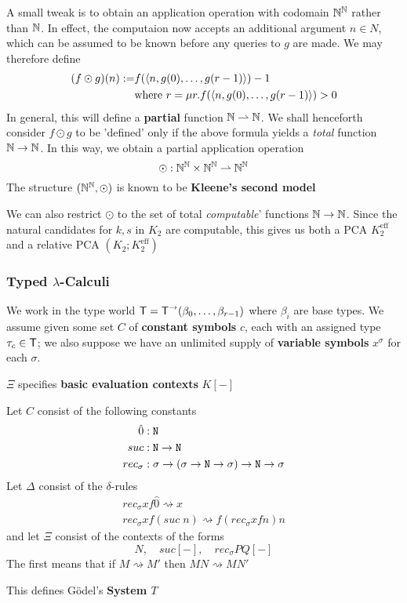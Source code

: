 \documentclass[11pt]{article}
\DeclareMathOperator{\eff}{eff}
\begin{document}
A small tweak is to obtain an application operation with codomain \(\mathbb{N}^{\mathbb{N}}\) rather than \(\mathbb{N}\).
In effect, the computaion now accepts an additional argument \(n\in N\), which can be assumed to
be known before any queries to \(g\) are made. We may therefore define
\begin{align*}
(f\odot g)(n):=&f(\langle n,g(0),\dots,g(r-1)\rangle)-1\\
&\text{where }r=\mu r.f(\langle n,g(0),\dots,g(r-1)\rangle)>0
\end{align*}
In general, this will define a \textbf{partial} function \(\mathbb{N}\rightharpoonup\mathbb{N}\). We shall henceforth
consider \(f\odot g\) to be 'defined' only if the above formula yields a \emph{total} function \(\mathbb{N}\to\mathbb{N}\). In
this way, we obtain a partial application operation
\begin{equation*}
\odot:\mathbb{N}^{\mathbb{N}}\times\mathbb{N}^{\mathbb{N}}\rightharpoonup\mathbb{N}^{\mathbb{N}}
\end{equation*}
The structure \((\mathbb{N}^{\mathbb{N}},\odot)\) is known to be \textbf{Kleene's second model}

We can also restrict \(\odot\) to the set of total \emph{computable}' functions \(\mathbb{N}\to\mathbb{N}\). Since the natural
candidates for \(k,s\) in \(K_2\) are computable, this gives us both a PCA \(K_2^{\eff}\) and a
relative PCA \((K_2;K_2^{\eff})\)
\subsubsection{Typed \texorpdfstring{\(\lambda\)}{λ}-Calculi}
\label{sec:org167de23}

We work in the type world \(\textsf{T}=\textsf{T}^{\to}(\beta_0,\dots,\beta_{r-1})\) where \(\beta_i\) are base types. We
assume given some set \(C\) of \textbf{constant symbols} \(c\), each with an assigned type \(\tau_c\in\textsf{T}\);
we also suppose we have an unlimited supply of \textbf{variable symbols} \(x^\sigma\) for each \(\sigma\).

\(\Xi\) specifies \textbf{basic evaluation contexts} \(K[-]\)

\begin{examplle}[]
Let \(C\) consist of the following constants
\begin{align*}
\hat{0}&:\texttt{N}\\
suc&:\texttt{N}\to\texttt{N}\\
rec_\sigma&:\sigma\to(\sigma\to\texttt{N}\to\sigma)\to\texttt{N}\to\sigma
\end{align*}
Let \(\Delta\) consist of the \(\delta\)-rules
\begin{gather*}
rec_\sigma xf\hat{0}\rightsquigarrow x\\
rec_\sigma xf(suc\; n)\rightsquigarrow f(rec_\sigma xfn)n
\end{gather*}
and let \(\Xi\) consist of the contexts of the forms
\begin{equation*}
[-]N,\quad suc[-],\quad rec_\sigma PQ[-]
\end{equation*}
The first means that if \(M\rightsquigarrow M'\) then \(MN\rightsquigarrow MN'\)

This defines Gödel's \textbf{System \(T\)}
\end{examplle}
\end{document}
